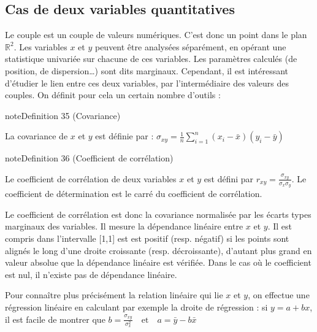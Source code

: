 \documentclass[letterpaper,10pt,english]{jupyterBook}
\begin{document}
\subsection{Cas de deux variables quantitatives}
\label{\detokenize{statsdescriptives:cas-de-deux-variables-quantitatives}}
\sphinxAtStartPar
Le couple est un couple de valeurs numériques. C’est donc un point dans le plan \(\mathbb{R}^2\). Les variables \(x\) et \(y\) peuvent être analysées séparément, en opérant une statistique univariée sur chacune de ces variables. Les paramètres calculés (de position, de dispersion…) sont dits marginaux. Cependant, il est intéressant d’étudier le lien entre ces deux variables, par l’intermédiaire des valeurs des couples. On définit pour cela un certain nombre d’outils :
\label{statsdescriptives:definition-19}
\begin{sphinxadmonition}{note}{Definition 35 (Covariance)}



\sphinxAtStartPar
La covariance de \(x\) et \(y\) est définie par :
\(\sigma_{xy}=\frac{1}{n}\displaystyle\sum_{i=1}^n\left (x_i-\bar{x}\right )\left (y_i-\bar{y}\right )\)
\end{sphinxadmonition}

\ignorespaces 
{}\ignorespaces \label{statsdescriptives:definition-20}
\begin{sphinxadmonition}{note}{Definition 36 (Coefficient de corrélation)}



\sphinxAtStartPar
Le coefficient de corrélation  de deux variables \(x\) et \(y\) est défini par
\(r_{xy}=\frac{\sigma_{xy}}{\sigma_{x}\sigma_{y}}\).
Le coefficient de détermination est le carré du coefficient de corrélation.
\end{sphinxadmonition}

\sphinxAtStartPar
Le coefficient de corrélation est donc la covariance normalisée par les écarts types marginaux des variables. Il mesure la dépendance linéaire entre \(x\) et \(y\). Il est compris dans l’intervalle {[}\sphinxhyphen{}1,1{]} est est positif (resp. négatif) si les points sont alignés le long d’une droite croissante (resp. décroissante), d’autant plus grand en valeur absolue que la dépendance linéaire est vérifiée. Dans le cas où le coefficient est nul, il n’existe pas de dépendance linéaire.

\sphinxAtStartPar
Pour connaître plus précisément la relation linéaire qui lie \(x\) et \(y\), on effectue une régression linéaire en calculant par exemple la droite de régression : si \(y=a+bx\), il est facile de montrer que
\(b=\frac{\sigma_{xy}}{\sigma_x^2}\quad\textrm{et}\quad a=\bar{y}-b\bar{x}\)
\end{document}
